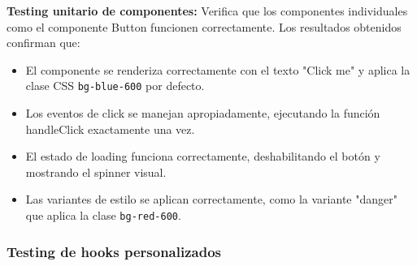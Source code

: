 \documentclass[12pt,a4paper,oneside]{report}
\begin{document}
\textbf{Testing unitario de componentes:} Verifica que los componentes individuales como el componente Button funcionen correctamente. Los resultados obtenidos confirman que:
\begin{itemize}
\item El componente se renderiza correctamente con el texto "Click me" y aplica la clase CSS \texttt{bg-blue-600} por defecto.
\item Los eventos de click se manejan apropiadamente, ejecutando la función handleClick exactamente una vez.
\item El estado de loading funciona correctamente, deshabilitando el botón y mostrando el spinner visual.
\item Las variantes de estilo se aplican correctamente, como la variante "danger" que aplica la clase \texttt{bg-red-600}.
\end{itemize}

\subsubsection{Testing de hooks
personalizados}\label{testing-de-hooks-personalizados}
\end{document}

